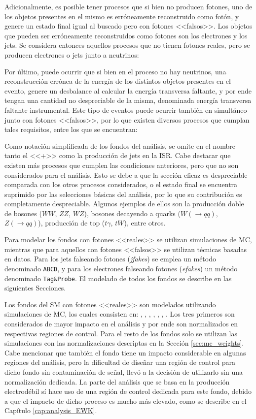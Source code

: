 Adicionalmente, es posible tener procesos que si bien no producen fotones, uno de los objetos presentes en el mismo es erróneamente reconstruido como fotón, y genere un estado final igual al buscado pero con fotones <<falsos>>. Los objetos que pueden ser erróneamente reconstruidos como fotones son los electrones y los jets. Se considera entonces aquellos procesos que no tienen fotones reales, pero se producen electrones o jets junto a neutrinos:



Por último, puede ocurrir que si bien en el proceso no hay neutrinos, una reconstrucción errónea de la energía de los distintos objetos presentes en el evento, genere un desbalance al calcular la energía transversa faltante, y por ende tengan una cantidad no despreciable de la misma, denominada energía transversa faltante instrumental. Este tipo de eventos puede ocurrir también en simultáneo junto con fotones <<falsos>>, por lo que existen diversos procesos que cumplan tales requisitos, entre los que se encuentran:

Como notación simplificada de los fondos del análisis, se omite en el nombre tanto el <<+>> como la producción de jets en la ISR. Cabe destacar que existen más procesos que cumplen las condiciones anteriores, pero que no son considerados para el análisis. Esto se debe a que la sección eficaz es despreciable comparada con los otros procesos considerados, o el estado final se encuentra suprimido por las selecciones básicas del análisis, por lo que su contribución es completamente despreciable. Algunos ejemplos de ellos son la producción doble de bosones ($WW$, $ZZ$, $WZ$), bosones decayendo a quarks ($W(\rightarrow qq)$, $Z(\rightarrow qq)$), producción de top ($t\gamma$, $tW$), entre otros.

Para modelar los fondos con fotones <<reales>> se utilizan simulaciones de MC, mientras que para aquellos con fotones <<falsos>> se utilizan técnicas basadas en datos. 
Para los jets falseando fotones (\textit{jfakes}) se emplea un método denominado \texttt{ABCD}, y para los electrones falseando fotones (\textit{efakes}) un método denominado \texttt{Tag\&Probe}. El modelado de todos los fondos se describe en las siguientes Secciones.



Los fondos del SM con fotones <<reales>> son modelados utilizando simulaciones de MC, los cuales consisten en: \phj, \wph, \ttbarph, \wphph, \zph, \zphph, \phph. Los tres primeros son considerados de mayor impacto en el análisis y por ende son normalizados en respectivas regiones de control. Para el resto de los fondos solo se utilizan las simulaciones con las normalizaciones descriptas en la Sección \ref{sec:mc_weights}. 
Cabe mencionar que también el fondo \znunuph tiene un impacto considerable en algunas regiones del análisis, pero la dificultad de diseñar una región de control para dicho fondo sin contaminación de señal, llevó a la decisión de utilizarlo sin una normalización dedicada. 
La parte del análisis que se basa en la producción electrodébil sí hace uso de una región de control dedicada para este fondo, debido a que el impacto de dicho proceso es mucho más elevado, como se describe en el Capítulo \ref{cap:analysis_EWK}.

